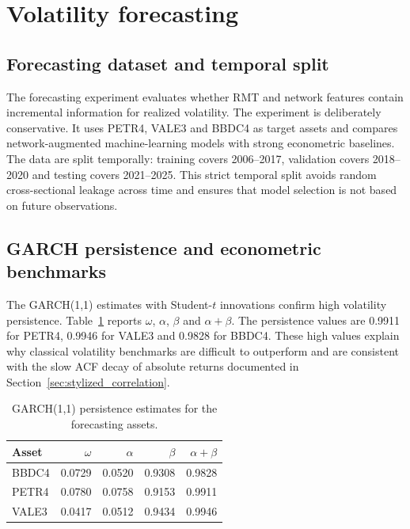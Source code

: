\section{Volatility forecasting}
\label{sec:forecasting}

\subsection{Forecasting dataset and temporal split}

The forecasting experiment evaluates whether RMT and network features contain incremental information for realized volatility. The experiment is deliberately conservative. It uses PETR4, VALE3 and BBDC4 as target assets and compares network-augmented machine-learning models with strong econometric baselines. The data are split temporally: training covers 2006--2017, validation covers 2018--2020 and testing covers 2021--2025. This strict temporal split avoids random cross-sectional leakage across time and ensures that model selection is not based on future observations.

\subsection{GARCH persistence and econometric benchmarks}

The GARCH(1,1) estimates with Student-$t$ innovations confirm high volatility persistence. Table~\ref{tab:garch_params} reports $\omega$, $\alpha$, $\beta$ and $\alpha+\beta$. The persistence values are 0.9911 for PETR4, 0.9946 for VALE3 and 0.9828 for BBDC4. These high values explain why classical volatility benchmarks are difficult to outperform and are consistent with the slow ACF decay of absolute returns documented in Section~\ref{sec:stylized_correlation}.

\begin{table}
\centering
\caption{GARCH(1,1) persistence estimates for the forecasting assets.}
\label{tab:garch_params}
\begin{tabular}{lrrrr}
\toprule
Asset & $\omega$ & $\alpha$ & $\beta$ & $\alpha+\beta$ \\
\midrule
BBDC4 & 0.0729 & 0.0520 & 0.9308 & 0.9828 \\
PETR4 & 0.0780 & 0.0758 & 0.9153 & 0.9911 \\
VALE3 & 0.0417 & 0.0512 & 0.9434 & 0.9946 \\
\bottomrule
\end{tabular}
\end{table}
\FloatBarrier

